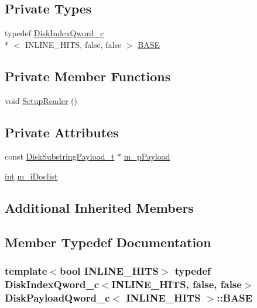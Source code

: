 \subsection*{Private Types}
\begin{DoxyCompactItemize}
\item 
typedef \hyperlink{classDiskIndexQword__c}{Disk\-Index\-Qword\-\_\-c}\\*
$<$ I\-N\-L\-I\-N\-E\-\_\-\-H\-I\-T\-S, false, false $>$ \hyperlink{classDiskPayloadQword__c_af2d432d53e68670437f894c559c2a33f}{B\-A\-S\-E}
\end{DoxyCompactItemize}
\subsection*{Private Member Functions}
\begin{DoxyCompactItemize}
\item 
void \hyperlink{classDiskPayloadQword__c_accd98c63a96ac6e35e53372396370447}{Setup\-Reader} ()
\end{DoxyCompactItemize}
\subsection*{Private Attributes}
\begin{DoxyCompactItemize}
\item 
const \hyperlink{structDiskSubstringPayload__t}{Disk\-Substring\-Payload\-\_\-t} $\ast$ \hyperlink{classDiskPayloadQword__c_ac15bc32720d8ba52bea6b16376c605c4}{m\-\_\-p\-Payload}
\item 
\hyperlink{sphinxexpr_8cpp_a4a26e8f9cb8b736e0c4cbf4d16de985e}{int} \hyperlink{classDiskPayloadQword__c_a3e176b09cf7cc8d380a1b0c5daaa5fe8}{m\-\_\-i\-Doclist}
\end{DoxyCompactItemize}
\subsection*{Additional Inherited Members}


\subsection{Member Typedef Documentation}
\hypertarget{classDiskPayloadQword__c_af2d432d53e68670437f894c559c2a33f}{
\subsubsection[{B\-A\-S\-E}]{\setlength{\rightskip}{0pt plus 5cm}template$<$bool I\-N\-L\-I\-N\-E\-\_\-\-H\-I\-T\-S$>$ typedef {\bf Disk\-Index\-Qword\-\_\-c}$<$I\-N\-L\-I\-N\-E\-\_\-\-H\-I\-T\-S, false, false$>$ {\bf Disk\-Payload\-Qword\-\_\-c}$<$ I\-N\-L\-I\-N\-E\-\_\-\-H\-I\-T\-S $>$\-::{\bf B\-A\-S\-E}\hspace{0.3cm}{\ttfamily [private]}}}\label{classDiskPayloadQword__c_af2d432d53e68670437f894c559c2a33f}


